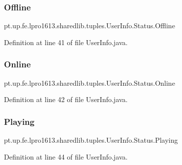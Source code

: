 \subsubsection{\texorpdfstring{Offline}{Offline}}
{\footnotesize\ttfamily pt.\+up.\+fe.\+lpro1613.\+sharedlib.\+tuples.\+User\+Info.\+Status.\+Offline}



Definition at line 41 of file User\+Info.\+java.

\hypertarget{enumpt_1_1up_1_1fe_1_1lpro1613_1_1sharedlib_1_1tuples_1_1_user_info_1_1_status_ab067f60ed9db74fcad27270d75df00c1}{}\label{enumpt_1_1up_1_1fe_1_1lpro1613_1_1sharedlib_1_1tuples_1_1_user_info_1_1_status_ab067f60ed9db74fcad27270d75df00c1} 
\subsubsection{\texorpdfstring{Online}{Online}}
{\footnotesize\ttfamily pt.\+up.\+fe.\+lpro1613.\+sharedlib.\+tuples.\+User\+Info.\+Status.\+Online}



Definition at line 42 of file User\+Info.\+java.

\hypertarget{enumpt_1_1up_1_1fe_1_1lpro1613_1_1sharedlib_1_1tuples_1_1_user_info_1_1_status_a64e1320707271e980af216630588aab5}{}\label{enumpt_1_1up_1_1fe_1_1lpro1613_1_1sharedlib_1_1tuples_1_1_user_info_1_1_status_a64e1320707271e980af216630588aab5} 
\subsubsection{\texorpdfstring{Playing}{Playing}}
{\footnotesize\ttfamily pt.\+up.\+fe.\+lpro1613.\+sharedlib.\+tuples.\+User\+Info.\+Status.\+Playing}



Definition at line 44 of file User\+Info.\+java.


